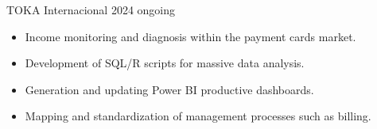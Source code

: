 \documentclass{simplecv}
\begin{document}





    {TOKA Internacional}
    {}
    {2024}
    {ongoing}
    {
     \vspace{-11pt}
     \begin{itemize}[leftmargin=*]
     \setlength{\itemsep}{0cm}
         \item Income monitoring and diagnosis within the payment cards market.
         \item Development of SQL/R scripts for massive data analysis.
         \item Generation and updating Power BI productive dashboards.
         \item Mapping and standardization of management processes such as billing.
     \end{itemize}
    }
\end{document}
